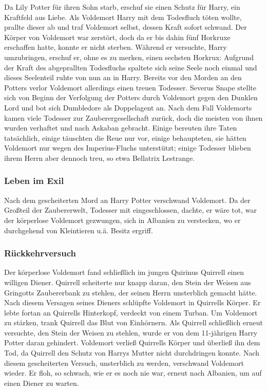 \documentclass[a4paper, 10pt]{article}
\begin{document}
\vspace{10pt}
\newline
{}  
Da Lily Potter für ihren Sohn starb, erschuf sie einen Schutz für Harry, ein Kraftfeld aus Liebe. Als Voldemort Harry mit dem Todesfluch töten wollte, prallte dieser ab und traf Voldemort selbst, dessen Kraft sofort schwand. Der Körper von Voldemort war zerstört, doch da er bis dahin fünf Horkruxe erschaffen hatte, konnte er nicht sterben. Während er versuchte, Harry umzubringen, erschuf er, ohne es zu merken, einen sechsten Horkrux: Aufgrund der Kraft des abgeprallten Todesfluchs spaltete sich seine Seele noch einmal und dieses Seelenteil ruhte von nun an in Harry.
\vspace{10pt}
\newline
{}  
Bereits vor den Morden an den Potters verlor Voldemort allerdings einen treuen Todesser. Severus Snape stellte sich von Beginn der Verfolgung der Potters durch Voldemort gegen den Dunklen Lord und bot sich Dumbledore als Doppelagent an.
\vspace{10pt}
\newline
{}  
Nach dem Fall Voldemorts kamen viele Todesser zur Zauberergesellschaft zurück, doch die meisten von ihnen wurden verhaftet und nach Askaban gebracht. Einige bereuten ihre Taten tatsächlich, einige täuschten die Reue nur vor, einige behaupteten, sie hätten Voldemort nur wegen des Imperius-Fluchs unterstützt; einige Todesser blieben ihrem Herrn aber dennoch treu, so etwa Bellatrix Lestrange.
\subsubsection*{\large Leben im Exil}
Nach dem gescheiterten Mord an Harry Potter verschwand Voldemort. Da der Großteil der Zaubererwelt, Todesser mit eingeschlossen, dachte, er wäre tot, war der körperlose Voldemort gezwungen, sich in Albanien zu verstecken, wo er durchgehend von Kleintieren u.ä. Besitz ergriff.
\subsubsection*{\large Rückkehrversuch}
Der körperlose Voldemort fand schließlich im jungen Quirinus Quirrell einen willigen Diener. Quirrell scheiterte nur knapp daran, den Stein der Weisen aus Gringotts Zaubererbank zu stehlen, der seinen Herrn unsterblich gemacht hätte. Nach diesem Versagen seines Dieners schlüpfte Voldemort in Quirrells Körper. Er lebte fortan an Quirrells Hinterkopf, verdeckt von einem Turban. Um Voldemort zu stärken, trank Quirrell das Blut von Einhörnern. Als Quirrell schließlich erneut versuchte, den Stein der Weisen zu stehlen, wurde er von dem 11-jährigen Harry Potter daran gehindert. Voldemort verließ Quirrells Körper und überließ ihn dem Tod, da Quirrell den Schutz von Harrys Mutter nicht durchdringen konnte.
\vspace{10pt}
\newline
{}  
Nach diesem gescheiterten Versuch, unsterblich zu werden, verschwand Voldemort wieder. Er floh, so schwach, wie er es noch nie war, erneut nach Albanien, um auf einen Diener zu warten.
\end{document}
